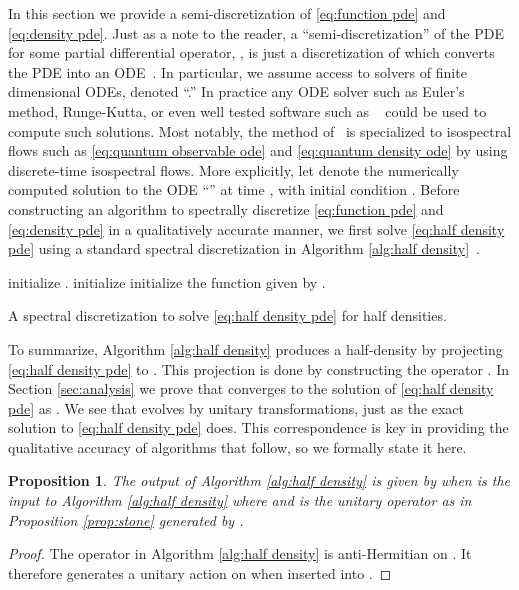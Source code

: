\documentclass[final,leqno]{amsart}
\newtheorem{proposition}[theorem]{Proposition}
\begin{document}
In this section we provide a semi-discretization of \eqref{eq:function pde} and \eqref{eq:density pde}.
Just as a note to the reader, a ``semi-discretization''  of the PDE  for some partial differential operator, , is just a discretization of  which 
converts the PDE into an ODE~\cite{Gottlieb1977numerical}.
In particular, we assume access to solvers of finite dimensional ODEs, denoted ``.''
In practice any ODE solver such as Euler's method, Runge-Kutta, or even well tested software such as ~\cite{VODE} could be used to compute such solutions.
Most notably, the method of~\cite{Calvo1997} is specialized to isospectral flows such as  \eqref{eq:quantum observable ode} and \eqref{eq:quantum density ode} by using discrete-time isospectral flows.
More explicitly, let  denote the numerically computed solution  to the ODE ``'' at time , with initial condition .
Before constructing an algorithm to spectrally discretize \eqref{eq:function pde} and \eqref{eq:density pde} in a qualitatively accurate manner, we first solve \eqref{eq:half density pde} using a standard spectral discretization in Algorithm \ref{alg:half density}~\cite{Boyd2001,NumericalRecipes}.

\begin{algorithm}
initialize .\;
	initialize \;
	\For{ }{
		\;
		\For{}{
			
		} 
	}
	initialize the function  given by .\;
	\;
	\caption{A spectral discretization to solve \eqref{eq:half density pde} for half densities.} \label{alg:half density}
\end{algorithm}

To summarize, Algorithm \ref{alg:half density} produces a half-density  by projecting \eqref{eq:half density pde} to .
This projection is done by constructing the operator .
In Section \ref{sec:analysis} we prove that  converges to the solution of \eqref{eq:half density pde} as .
We see that  evolves by unitary transformations, just as the exact solution to \eqref{eq:half density pde} does.
This correspondence is key in providing the qualitative accuracy of algorithms that follow, so we formally state it here.
\begin{proposition} \label{prop:unitary}
	The output of Algorithm \ref{alg:half density} is given by  when  is the input to Algorithm \ref{alg:half density} where  and  is the unitary operator as in Proposition \ref{prop:stone} generated by .
\end{proposition}
\begin{proof}
	The operator  in Algorithm \ref{alg:half density} is anti-Hermitian on .
	It therefore generates a unitary action on  when inserted into .
\end{proof}
\end{document}
